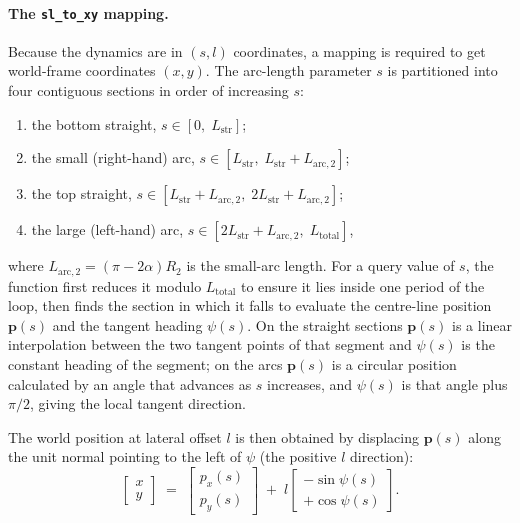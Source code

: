 \documentclass{article}
\begin{document}
\paragraph{The \texttt{sl\_to\_xy} mapping.}
Because the dynamics are in $(s,l)$ coordinates, a mapping is required to get world-frame coordinates $(x,y)$. The arc-length parameter $s$ is partitioned into four contiguous sections in order of increasing $s$:
\begin{enumerate}
    \item the bottom straight, $s\in[0,\;L_{\text{str}}]$;
    \item the small (right-hand) arc, $s\in[L_{\text{str}},\;L_{\text{str}} + L_{\text{arc},2}]$;
    \item the top straight, $s\in[L_{\text{str}} + L_{\text{arc},2},\;2L_{\text{str}} + L_{\text{arc},2}]$;
    \item the large (left-hand) arc, $s\in[2L_{\text{str}} + L_{\text{arc},2},\;L_{\text{total}}]$,
\end{enumerate}
where $L_{\text{arc},2}=(\pi-2\alpha)R_2$ is the small-arc length. 
For a query value of $s$, the function first reduces it modulo $L_{\text{total}}$ to ensure it lies inside one period of the loop, then finds the section in which it falls to evaluate the centre-line position $\mathbf{p}(s)$ and the tangent heading $\psi(s)$. On the straight sections $\mathbf{p}(s)$ is a linear interpolation between the two tangent points of that segment and $\psi(s)$ is the constant heading of the segment; on the arcs $\mathbf{p}(s)$ is a circular position calculated by an angle that advances as $s$ increases, and $\psi(s)$ is that angle plus $\pi/2$, giving the local tangent direction.

The world position at lateral offset $l$ is then obtained by displacing $\mathbf{p}(s)$ along the unit normal pointing to the left of $\psi$ (the positive $l$ direction):
\begin{equation}
    \begin{bmatrix} x \\ y \end{bmatrix}
    \;=\;
    \begin{bmatrix} p_x(s) \\ p_y(s) \end{bmatrix}
    \;+\; l
    \begin{bmatrix} -\sin\psi(s) \\ +\cos\psi(s) \end{bmatrix}.
    \label{eq:sl_to_xy}
\end{equation}
\end{document}
